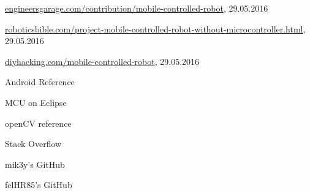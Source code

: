 \documentclass[openany]{mgr} %
\begin{document}
\begin{thebibliography}{9}

\url{engineersgarage.com/contribution/mobile-controlled-robot},
29.05.2016

\url{roboticsbible.com/project-mobile-controlled-robot-without-microcontroller.html}, 
29.05.2016

\url{diyhacking.com/mobile-controlled-robot},
29.05.2016

 Android Reference

 MCU on Eclipse

 openCV reference

 Stack Overflow

 mik3y's GitHub

 felHR85's GitHub

\end{thebibliography}
\end{document}
